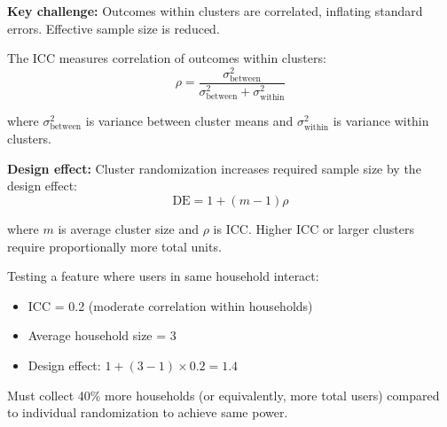 \textbf{Key challenge:} Outcomes within clusters are correlated, inflating standard errors. Effective sample size is reduced.

\begin{definition}
The ICC measures correlation of outcomes within clusters:
\begin{equation}
\rho = \frac{\sigma_{\text{between}}^2}{\sigma_{\text{between}}^2 + \sigma_{\text{within}}^2}
\end{equation}

where $\sigma_{\text{between}}^2$ is variance between cluster means and $\sigma_{\text{within}}^2$ is variance within clusters.
\end{definition}

\textbf{Design effect:} Cluster randomization increases required sample size by the design effect:
\begin{equation}
\text{DE} = 1 + (m - 1)\rho
\end{equation}

where $m$ is average cluster size and $\rho$ is ICC. Higher ICC or larger clusters require proportionally more total units.

\begin{example}
Testing a feature where users in same household interact:
\begin{itemize}
    \item ICC = 0.2 (moderate correlation within households)
    \item Average household size = 3
    \item Design effect: $1 + (3-1) \times 0.2 = 1.4$
\end{itemize}

Must collect 40\% more households (or equivalently, more total users) compared to individual randomization to achieve same power.
\end{example}


